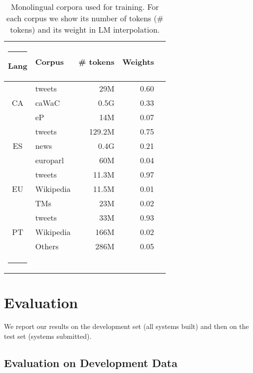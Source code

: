 \documentclass[postprint]{flammie}
\begin{document}
{\small
\begin{table} [t]
\centering
\begin{tabular} {clrrr}
  \hline\rule{-2pt}{15pt}
  \bf Lang & \bf Corpus  & \bf \# tokens & \bf Weights \\
  \hline
  \multirow{3}{*}{CA} & tweets & 29M & 0.60 \\
  & caWaC & 0.5G & 0.33 \\
  
  & eP & 14M & 0.07 \\
  \hline

  \multirow{3}{*}{ES} & tweets & 129.2M & 0.75 \\
  & news & 0.4G & 0.21\\
  & europarl & 60M & 0.04 & \\
  \hline

  \multirow{3}{*}{EU} & tweets & 11.3M & 0.97 \\
  & Wikipedia & 11.5M &0.01\\
  & TMs & 23M & 0.02 \\
  \hline
  \multirow{3}{*}{PT} & tweets & 33M& 0.93 \\
  & Wikipedia &166M & 0.02\\
  & Others & 286M & 0.05 \\
  
  \hline\rule{-4pt}{10pt}
\end{tabular}
\caption{\label{t:mono}Monolingual corpora used for training.
For each corpus we show its number of tokens (\# tokens) and its weight in LM interpolation.}
\end{table}
}












\section{Evaluation}\label{s:eval}


We report our results on the development set (all systems built) and then on the test set (systems submitted).


\subsection{Evaluation on Development Data}
\end{document}

